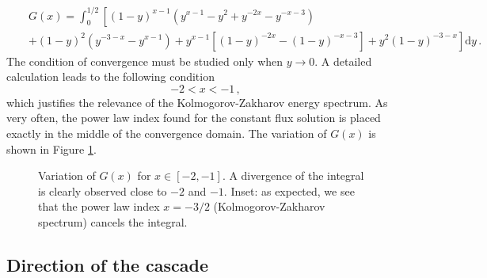 \documentclass{jpp}
\newcommand{\red}[1]{}
\def\be{\begin{equation}}
\def\ee{\end{equation}}
\def\ba{\begin{eqnarray}}
\def\ea{\end{eqnarray}}
\def\dd{\mathrm{d}}
\begin{document}
\red{\ba
G(x) &=& \sum_{ss_{p} s_{q}} I^{ss_ps_q}(x) \\
&=& {1 \over 2} \int_0^{1} \left[ (1-y)^{x-1} (y^{x-1}-y^2+2y^{-2x}-2y^{-x-3}) + (1-y)^2 (2y^{-3-x}-y^{x-1}) \right] \dd y \, . \nonumber 
\ea}
\red{Then, we split the integral in two parts ($\int_0^{1/2} + \int_{1/2}^{1}$) and get after modification of the second integral (with a change of variable $y \to 1-y$)}
\ba
&& G(x) = \int_0^{1/2} 
\left[ (1-y)^{x-1} (y^{x-1}-y^2+y^{-2x}-y^{-x-3}) \right. \\
&& \left. + (1-y)^2(y^{-3-x}-y^{x-1}) + y^{x-1} \left[(1-y)^{-2x}-(1-y)^{-x-3}\right] + y^2(1-y)^{-3-x} \right] \dd y \, . \nonumber 
\ea
The condition of convergence must be studied only when $y \to 0$. A detailed calculation leads to the following condition 
\be
-2 < x < -1 \, , 
\ee
which justifies the relevance of the Kolmogorov-Zakharov energy spectrum. As very often, the power law index found for the constant flux solution is placed exactly in the middle of the convergence domain. The variation of $G(x)$ is shown in Figure \ref{fig1}.
\begin{figure}
\caption{Variation of $G(x)$ for $x \in [-2,-1]$. A divergence of the integral is clearly observed close to $-2$ and $-1$. Inset: as expected, we see that the power law index $x=-3/2$ (Kolmogorov-Zakharov spectrum) cancels the integral.}
\label{fig1}
\end{figure}


\subsection{Direction of the cascade}
\end{document}

